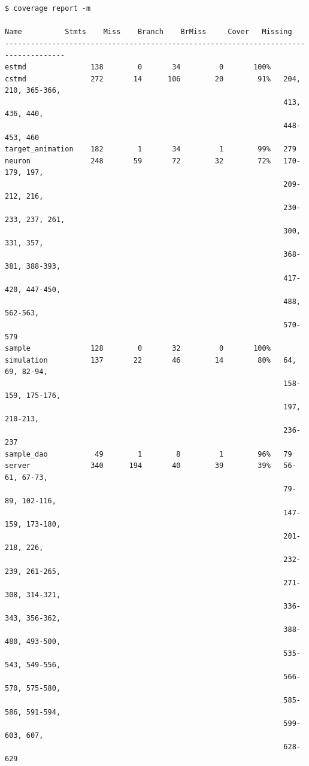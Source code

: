 \documentclass[a4paper,11pt]{article}
\begin{document}
\begin{verbatim}
$ coverage report -m

Name 	      Stmts    Miss    Branch    BrMiss     Cover   Missing
------------------------------------------------------------------------------------
estmd               138        0       34         0       100%   
cstmd               272       14      106        20        91%   204, 210, 365-366, 
                                                                 413, 436, 440, 
                                                                 448-453, 460
target_animation    182        1       34         1        99%   279
neuron              248       59       72        32        72%   170-179, 197,
                                                                 209-212, 216,
                                                                 230-233, 237, 261,
                                                                 300, 331, 357, 
                                                                 368-381, 388-393,
                                                                 417-420, 447-450,
                                                                 488, 562-563,
                                                                 570-579
sample              128        0       32         0       100%   
simulation          137       22       46        14        80%   64, 69, 82-94, 
                                                                 158-159, 175-176, 
                                                                 197, 210-213, 
                                                                 236-237
sample_dao           49        1        8         1        96%   79
server              340      194       40        39        39%   56-61, 67-73, 
                                                                 79-89, 102-116,
                                                                 147-159, 173-180, 
                                                                 201-218, 226, 
                                                                 232-239, 261-265, 
                                                                 271-308, 314-321, 
                                                                 336-343, 356-362, 
                                                                 388-480, 493-500, 
                                                                 535-543, 549-556, 
                                                                 566-570, 575-580, 
                                                                 585-586, 591-594, 
                                                                 599-603, 607, 
                                                                 628-629


\end{verbatim}
\end{document}
